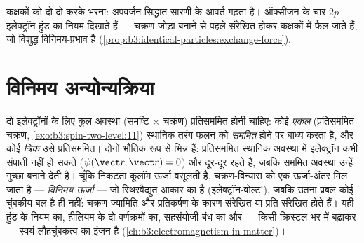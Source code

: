 \begin{omfigure}

{\small कक्षकों को दो-दो करके भरना: अपवर्जन सिद्धांत सारणी के आवर्त
गढ़ता है। ऑक्सीजन के चार $2p$ इलेक्ट्रॉन हुंड का नियम दिखाते हैं ---
चक्रण जोड़ा बनाने से पहले संरेखित होकर कक्षकों में फैल जाते हैं,
जो विशुद्ध विनिमय-प्रभाव है
(\cref{prop:b3:identical-particles:exchange-force}).}
\end{omfigure}

\section{विनिमय अन्योन्यक्रिया}

\begin{proposition}\label{prop:b3:identical-particles:exchange-force}
दो इलेक्ट्रॉनों के लिए कुल अवस्था (समष्टि $\times$ चक्रण) प्रतिसममित
होनी चाहिए: कोई \emph{एकल} (प्रतिसममित चक्रण,
\cref{exo:b3:spin-two-level:11}) स्थानिक तरंग फलन को \emph{सममित} होने
पर बाध्य करता है, और कोई \emph{त्रिक} उसे प्रतिसममित। दोनों भौतिक रूप
से भिन्न हैं: प्रतिसममित स्थानिक अवस्था में इलेक्ट्रॉन कभी संपाती नहीं
हो सकते ($\psi(\vect r, \vect r) = 0$) और दूर-दूर रहते हैं, जबकि
सममित अवस्था उन्हें गुच्छा बनाने देती है। चूँकि निकटता कूलॉम ऊर्जा
वसूलती है, चक्रण-विन्यास को एक ऊर्जा-अंतर मिल जाता है --- \emph{विनिमय
ऊर्जा} --- जो स्थिरवैद्युत आकार का है (इलेक्ट्रॉन-वोल्ट!), जबकि उतना
प्रबल कोई चुंबकीय बल है ही नहीं: चक्रण ज्यामिति और प्रतिकर्षण के कारण
संरेखित या प्रति-संरेखित होते हैं। यही हुंड के नियम का, हीलियम के दो
वर्णक्रमों का, सहसंयोजी बंध का और --- किसी क्रिस्टल भर में बढ़ाकर ---
स्वयं लौहचुंबकत्व का इंजन है
(\cref{ch:b3:electromagnetism-in-matter})।
\end{proposition}


